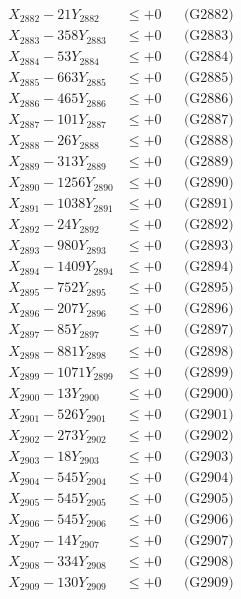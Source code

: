 \documentclass[a4paper,10pt]{article}
\begin{document}
{\begin{align}
X_{2882} - 21Y_{2882} &\leq +0 && \text{(G2882)} \\
X_{2883} - 358Y_{2883} &\leq +0 && \text{(G2883)} \\
X_{2884} - 53Y_{2884} &\leq +0 && \text{(G2884)} \\
X_{2885} - 663Y_{2885} &\leq +0 && \text{(G2885)} \\
X_{2886} - 465Y_{2886} &\leq +0 && \text{(G2886)} \\
X_{2887} - 101Y_{2887} &\leq +0 && \text{(G2887)} \\
X_{2888} - 26Y_{2888} &\leq +0 && \text{(G2888)} \\
X_{2889} - 313Y_{2889} &\leq +0 && \text{(G2889)} \\
X_{2890} - 1256Y_{2890} &\leq +0 && \text{(G2890)} \\
\allowbreak
X_{2891} - 1038Y_{2891} &\leq +0 && \text{(G2891)} \\
X_{2892} - 24Y_{2892} &\leq +0 && \text{(G2892)} \\
X_{2893} - 980Y_{2893} &\leq +0 && \text{(G2893)} \\
X_{2894} - 1409Y_{2894} &\leq +0 && \text{(G2894)} \\
X_{2895} - 752Y_{2895} &\leq +0 && \text{(G2895)} \\
X_{2896} - 207Y_{2896} &\leq +0 && \text{(G2896)} \\
X_{2897} - 85Y_{2897} &\leq +0 && \text{(G2897)} \\
X_{2898} - 881Y_{2898} &\leq +0 && \text{(G2898)} \\
X_{2899} - 1071Y_{2899} &\leq +0 && \text{(G2899)} \\
X_{2900} - 13Y_{2900} &\leq +0 && \text{(G2900)} \\
\allowbreak
X_{2901} - 526Y_{2901} &\leq +0 && \text{(G2901)} \\
X_{2902} - 273Y_{2902} &\leq +0 && \text{(G2902)} \\
X_{2903} - 18Y_{2903} &\leq +0 && \text{(G2903)} \\
X_{2904} - 545Y_{2904} &\leq +0 && \text{(G2904)} \\
X_{2905} - 545Y_{2905} &\leq +0 && \text{(G2905)} \\
X_{2906} - 545Y_{2906} &\leq +0 && \text{(G2906)} \\
X_{2907} - 14Y_{2907} &\leq +0 && \text{(G2907)} \\
X_{2908} - 334Y_{2908} &\leq +0 && \text{(G2908)} \\
X_{2909} - 130Y_{2909} &\leq +0 && \text{(G2909)} \\

\end{align}}
\end{document}
